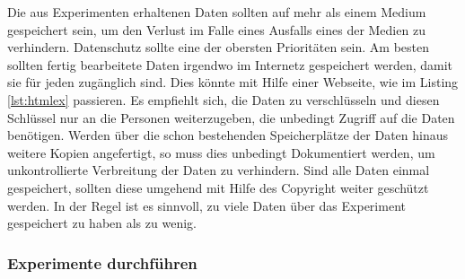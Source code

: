     Die aus Experimenten erhaltenen Daten sollten auf mehr als einem Medium gespeichert sein, um 
    den Verlust im Falle eines Ausfalls eines der Medien zu verhindern. Datenschutz sollte eine der 
    obersten Prioritäten sein. Am besten sollten fertig bearbeitete Daten irgendwo im Internetz gespeichert
    werden, damit sie für jeden zugänglich sind. Dies könnte mit Hilfe einer Webseite, wie im Listing
    \ref{lst:htmlex} passieren. Es empfiehlt sich, die Daten zu verschlüsseln und diesen Schlüssel 
    nur an die Personen weiterzugeben, die unbedingt Zugriff auf die Daten benötigen. Werden über 
    die schon bestehenden Speicherplätze der Daten hinaus weitere Kopien angefertigt, so muss dies 
    unbedingt Dokumentiert werden, um unkontrollierte Verbreitung der Daten zu verhindern. Sind alle 
    Daten einmal gespeichert, sollten diese umgehend mit Hilfe des Copyright weiter geschützt werden. 
    In der Regel ist es sinnvoll, zu viele Daten über das Experiment gespeichert zu haben als zu wenig.   


    \subsubsection{Experimente durchführen}

